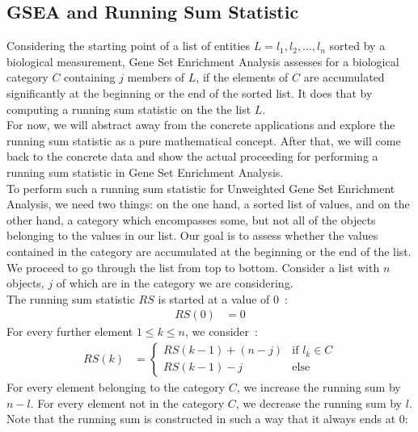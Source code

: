 \subsection{GSEA and Running Sum Statistic}\label{subsec:ea_gsea_rss}
Considering the starting point of a list of entities $L = l_1, l_2, \ldots, l_n$ sorted by a biological measurement, Gene Set Enrichment Analysis assesses for a biological category $C$ containing $j$ members of $L$, if the elements of $C$ are accumulated significantly at the beginning or the end of the sorted list. It does that by computing a running sum statistic on the the list $L$.\\
For now, we will abstract away from the concrete applications and explore the running sum statistic as a pure mathematical concept. After that, we will come back to the concrete data and show the actual proceeding for performing a running sum statistic in Gene Set Enrichment Analysis.\\
To perform such a running sum statistic for Unweighted Gene Set Enrichment Analysis, we need two things: on the one hand, a sorted list of values, and on the other hand, a category which encompasses some, but not all of the objects belonging to the values in our list. Our goal is to assess whether the values contained in the category are accumulated at the beginning or the end of the list.\\
We proceed to go through the list from top to bottom. Consider a list with $n$ objects, $j$ of which are in the category we are considering.\\
The running sum statistic $RS$ is started at a value of $0$~\cite{genetrail_original}:
\begin{align}
RS(0)&=0
\end{align}
For every further element $1 \leq k \leq n$, we consider~\cite{genetrail_original}:
\begin{align}
RS(k)&=\begin{cases}
	RS(k-1)+(n-j)& \text{if }l_{k}\in C\\
	RS(k-1)-j&\text{else}
\end{cases}
\end{align}
For every element belonging to the category $C$, we increase the running sum by $n-l$. For every element not in the category $C$, we decrease the running sum by $l$.\\
Note that the running sum is constructed in such a way that it always ends at $0$:
